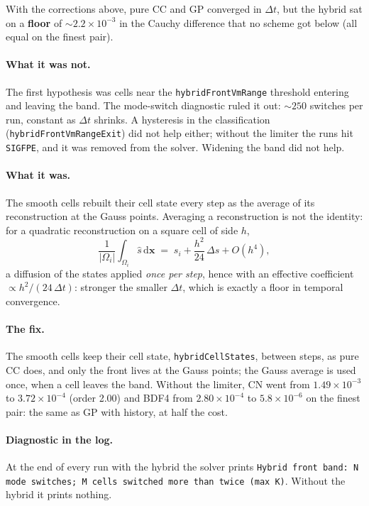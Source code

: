 \documentclass[11pt,a4paper]{article}
\newcommand{\code}[1]{\texttt{\small #1}}
\newcommand{\dictkey}[1]{\textcolor{black!60!green}{\texttt{\footnotesize #1}}}
\begin{document}
With the corrections above, pure CC and GP converged in $\Delta t$, but the hybrid
sat on a \textbf{floor} of $\sim2.2\times10^{-3}$ in the Cauchy difference that no
scheme got below (all equal on the finest pair).

\paragraph{What it was not.} The first hypothesis was cells near the
\dictkey{hybridFrontVmRange} threshold entering and leaving the band. The
mode-switch diagnostic ruled it out: $\sim250$ switches per run, constant as
$\Delta t$ shrinks. A hysteresis in the classification
(\code{hybridFrontVmRangeExit}) did not help either; without the limiter the runs
hit \code{SIGFPE}, and it was removed from the solver. Widening the band did not
help.

\paragraph{What it was.} The smooth cells rebuilt their cell state every step as
the average of its reconstruction at the Gauss points. Averaging a reconstruction
is not the identity: for a quadratic reconstruction on a square cell of side $h$,
\begin{equation}
  \frac{1}{|\Omega_i|}\int_{\Omega_i}\widehat{s}\,\mathrm{d}\mathbf{x}
  \;=\; s_i + \frac{h^2}{24}\,\Delta s + O(h^4),
\end{equation}
a diffusion of the states applied \emph{once per step}, hence with an effective
coefficient $\propto h^2/(24\,\Delta t)$: stronger the smaller $\Delta t$, which is
exactly a floor in temporal convergence.

\paragraph{The fix.} The smooth cells keep their cell state,
\code{hybridCellStates}, between steps, as pure CC does, and only the front lives at
the Gauss points; the Gauss average is used once, when a cell leaves the band.
Without the limiter, CN went from $1.49\times10^{-3}$ to $3.72\times10^{-4}$ (order
2.00) and BDF4 from $2.80\times10^{-4}$ to $5.8\times10^{-6}$ on the finest pair:
the same as GP with history, at half the cost.

\paragraph{Diagnostic in the log.} At the end of every run with the hybrid the
solver prints \code{Hybrid front band: N mode switches; M cells switched more than
twice (max K)}. Without the hybrid it prints nothing.
\end{document}
